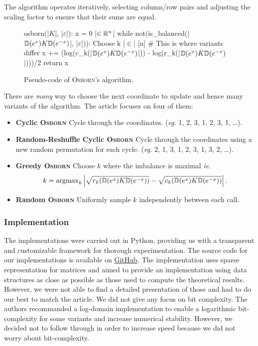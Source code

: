 The algorithm operates iteratively, selecting column/row pairs and adjusting the scaling factor to ensure that their sums are equal.

\begin{figure}[H]
    \begin{code}
osborn(|\(K\)|, |\(\varepsilon\)|):
    x = 0 |\(\in \mathbb{R}^n\)|
    while not(is_balanced(|\(\mathbb{D}(e^x) K \mathbb{D}(e^{-x})\)|, |\(\varepsilon\)|)):
        Choose k |\(\in\)| [n] # This is where variants differ
        x += (log(c_k(|\(\mathbb{D}(e^x) K \mathbb{D}(e^{-x})\)|)) - log(r_k(|\(\mathbb{D}(e^x) K \mathbb{D}(e^{-x})\)|)))/2
    return x
    \end{code}
    \caption{Pseudo-code of \textsc{Osborn}'s algorithm.}
\end{figure}

There are \textit{many} way to choose the next coordinate to update and hence many variants of the algorithm. The article focuses on four of them:
\begin{itemize}
    \item \textbf{Cyclic \textsc{Osborn}} Cycle through the coordinates. (\textit{eg.} {\color{magenta}1, 2, 3}, {\color{cyan}1, 2, 3}, {\color{red}1,} \dots).
    \item \textbf{Random-Reshuffle Cyclic \textsc{Osborn}} Cycle through the coordinates using a new random permutation for each cycle. (\textit{eg.} {\color{magenta}2, 1, 3}, {\color{cyan}1, 2, 3}, {\color{red}1, 3, 2}, \dots).
    \item \textbf{Greedy \textsc{Osborn}} Choose \(k\) where the imbalance is maximal \textit{ie.}
    \[
        k = \operatorname{argmax}_{k}\left|\sqrt{r_k(\mathbb{D}(e^x) K \mathbb{D}(e^{-x}))} - \sqrt{c_k(\mathbb{D}(e^x) K \mathbb{D}(e^{-x}))}\right|.    
    \]
    \item \textbf{Random \textsc{Osborn}} Uniformly sample \(k\) independently between each call.
\end{itemize}

\subsubsection{Implementation}

The implementations were carried out in Python, providing us with a transparent and customizable framework for thorough experimentation. The source code for our implementations is available on \href{https://github.com/alexicanesse/Near-linear-convergence-of-the-Random-Osborne-algorithm-for-Matrix-Balancing}{GitHub}. The implementation uses sparse representation for matrices and aimed to provide an implementation using data structures as close as possible as those used to compute the theoretical results. However, we were not able to find a detailed presentation of those and had to do our best to match the article. We did not give any focus on bit complexity. The authors recommanded a log-domain implementation to enable a logarithmic bit-complexity for some variants and increase numerical stability. However, we decided not to follow through in order to increase speed because we did not worry about bit-complexity.\\

